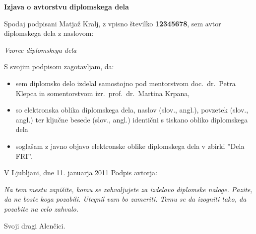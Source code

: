 \documentclass[a4paper, 12pt]{book}
\newcommand{\clearemptydoublepage}{\newpage{\pagestyle{empty}\cleardoublepage}}
\begin{document}
\clearemptydoublepage

\vspace*{1cm}
\begin{center} 
{\Large \textbf{\sc Izjava o avtorstvu diplomskega dela}}
\end{center}

\vspace{1cm}
\noindent Spodaj podpisani Matjaž Kralj,
z vpisno številko \textbf{12345678}, sem avtor  diplomskega dela z naslovom:
   
\vspace{0.5cm}
\emph{Vzorec diplomskega dela}

\vspace{1.5cm}
\noindent S svojim podpisom zagotavljam, da:
\begin{itemize}
	\item sem diplomsko delo izdelal samostojno pod mentorstvom 
		doc.\ dr.\ Petra Klepca in somentorstvom izr.\ prof.\ dr.\ Martina Krpana,

	\item	so elektronska oblika diplomskega dela, naslov (slov., angl.), povzetek (slov., angl.) ter ključne besede (slov., angl.) identični s tiskano obliko diplomskega dela
	\item soglašam z javno objavo elektronske oblike diplomskega dela v zbirki ''Dela FRI''.
\end{itemize}

\vspace{1cm}
\noindent V Ljubljani, dne 11. januarja 2011 \hfill Podpis avtorja:

\clearemptydoublepage

\thispagestyle{empty}\mbox{}\vfill\null\it%
Na tem mestu zapišite, komu se zahvaljujete za izdelavo diplomske naloge. Pazite, da ne boste koga pozabili. Utegnil vam bo zameriti. Temu se da izogniti tako, da pozabite na celo zahvalo.
\rm\normalfont

\clearemptydoublepage

\thispagestyle{empty}\mbox{}{\textheight}\mbox{}\hfill\begin{minipage}{0.55\textwidth}%
Svoji dragi Alenčici.
\normalfont\end{minipage}
 
\clearemptydoublepage
\end{document}
